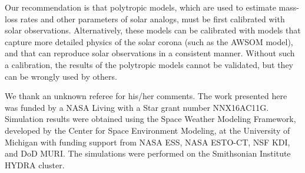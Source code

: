\documentclass[apj]{emulateapj}
\begin{document}
Our recommendation is that polytropic models, which are used to estimate mass-loss rates and other parameters of solar analogs, must be first calibrated with solar observations. Alternatively, these models can be calibrated with models that capture more detailed physics of the solar corona (such as the AWSOM model), and that can reproduce solar observations in a consistent manner. Without such a calibration, the results of the polytropic models cannot be validated, but they can be wrongly used by others. 


\acknowledgments

We thank an unknown referee for his/her comments. The work presented here was funded by a NASA Living with a Star grant number NNX16AC11G. Simulation results were obtained using the Space Weather Modeling Framework, developed by the Center for Space Environment Modeling, at the University of Michigan with funding support from NASA ESS, NASA ESTO-CT, NSF KDI, and DoD MURI. The simulations were performed on the Smithsonian Institute HYDRA cluster. 

\end{document}
